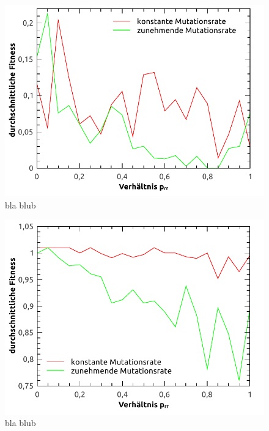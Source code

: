 \documentclass[12pt,
    a4paper,
    headinclude,
    footinclude]{scrartcl}
\begin{document}
	
	\begin{figure}[!h]
		\begin{center}
			\includegraphics[width=\size\textwidth]{../vortrag/abbildungen/vergleich_mutationsraten_n4.pdf}
			\caption{bla blub}
		\end{center}
	\end{figure}
	
	\begin{figure}[!h]
		\begin{center}
			\includegraphics[width=\size\textwidth]{../vortrag/abbildungen/vergleich_mutationsraten_n32.pdf}
			\caption{bla blub}
		\end{center}
	\end{figure}
\end{document}
